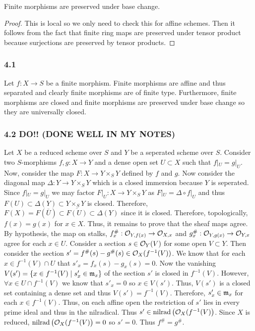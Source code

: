 \documentclass[12pt]{article}
\begin{document}
\begin{lemma}
Finite morphisms are preserved under base change. 
\end{lemma}

\begin{proof}
This is local so we only need to check this for affine schemes. Then it follows from the fact that finite ring maps are preserved under tensor product because surjections are preserved by tensor products.
\end{proof}

\subsubsection{4.1}

Let $f : X \to S$ be a finite morphism. Finite morphisms are affine and thus separated and clearly finite morphisms are of finite type. Furthermore, finite morphisms are closed and finite morphisms are preserved under base change so they are universally closed.  

\subsubsection{4.2 DO!! (DONE WELL IN MY NOTES)}

Let $X$ be a reduced scheme over $S$ and $Y$ be a seperated scheme over $S$. Consider two $S$-morphisms $f,g : X \to Y$ and a dense open set $U \subset X$ such that $f|_U = g|_U$. Now, consider the map $F : X \to Y \times_S Y$ defined by $f$ and $g$. Now consider the diagonal map $\Delta : Y \to Y \times_S Y$ which is a closed immersion because $Y$ is seperated. Since $f|_U = g|_U$ we may factor $F |_U : X \to Y \times_S Y$ as $F|_U = \Delta \circ f|_U$ and thus $F(U) \subset \Delta(Y) \subset Y \times_S Y$ is closed. Therefore, $F(X) = F(\overline{U}) \subset \overline{F(U)} \subset \Delta(Y)$ since it is closed. Therefore, topologically, $f(x) = g(x)$ for $x \in X$. Thus, it remains to prove that the sheaf maps agree. By hypothesis, the map on stalks, $f^\#_x : \mathcal{O}_{Y, f(x)} \to \mathcal{O}_{X, x}$ and $g^\#_x : \mathcal{O}_{Y, g(x)} \to \mathcal{O}_{Y, x}$ agree for each $x \in U$. Consider a section $s \in \mathcal{O}_{Y}(V)$ for some open $V \subset Y$. Then consider the section $s' = f^\#(s) - g^\#(s) \in \mathcal{O}_{X}(f^{-1}(V))$. We know that for each $x \in f^{-1}(V) \cap U$ that $s'_x = f_x(s) - g_x(s) = 0$. Now the vanishing $V(s') = \{ x \in f^{-1}(V) \mid s'_x \in \mathfrak{m}_x \}$ of the section $s'$ is closed in $f^{-1}(V)$. However, $\forall x \in U \cap f^{-1}(V)$ we know that $s'_x = 0$ so $x \in V(s')$. Thus, $V(s')$ is a closed set containing a dense set and thus $V(s') = f^{-1}(V)$. Therefore, $s'_x \in \mathfrak{m}_x$ for each $x \in f^{-1}(V)$. Thus, on each affine open the restriction of $s'$ lies in every prime ideal and thus in the nilradical. Thus $s' \in \mathrm{nilrad}\left( \mathcal{O}_{X}(f^{-1}(V) \right)$. Since $X$ is reduced, $\mathrm{nilrad}\left( \mathcal{O}_{X}(f^{-1}(V) \right) = 0$ so $s' = 0$. Thus $f^\# = g^\#$. 
\end{document}
